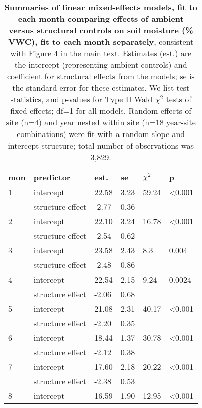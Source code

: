 \documentclass{article}
\begin{document}
\begin{table}[ht]
\centering
\caption{\textbf{Summaries of linear mixed-effects models, fit to each month comparing effects of ambient versus structural controls on soil moisture (\% VWC), fit to each month separately}, consistent with Figure 4 in the main text. Estimates (est.) are the intercept (representing ambient controls) and coefficient for structural effects from the models; se is the standard error for these estimates. We list test statistics, and p-values for Type II Wald $\chi^{2}$ tests of fixed effects; df=1 for all models. Random effects of site (n=4) and year nested within site (n=18 year-site combinations) were fit with a random slope and intercept structure; total number of observations was 3,829.} 
\label{table:shamamb_soilmoism}
\begingroup\footnotesize
\begin{tabular}{|p{}|p{}p{}p{}p{}p{}|}
  \hline
mon & predictor & est. & se & $\chi^2$ & p \\ 
  \hline
  1 & intercept & 22.58 & 3.23 & 59.24 & <0.001 \\ 
   & structure effect & -2.77 & 0.36 &  &  \\ 
   \hline
  2 & intercept & 22.10 & 3.24 & 16.78 & <0.001 \\ 
   & structure effect & -2.54 & 0.62 &  &  \\ 
   \hline
  3 & intercept & 23.58 & 2.43 & 8.3 & 0.004 \\ 
   & structure effect & -2.48 & 0.86 &  &  \\ 
   \hline
  4 & intercept & 22.54 & 2.15 & 9.24 & 0.0024 \\ 
   & structure effect & -2.06 & 0.68 &  &  \\ 
   \hline
  5 & intercept & 21.08 & 2.31 & 40.17 & <0.001 \\ 
   & structure effect & -2.20 & 0.35 &  &  \\ 
   \hline
  6 & intercept & 18.44 & 1.37 & 30.78 & <0.001 \\ 
   & structure effect & -2.12 & 0.38 &  &  \\ 
   \hline
  7 & intercept & 17.60 & 2.18 & 20.22 & <0.001 \\ 
   & structure effect & -2.38 & 0.53 &  &  \\ 
   \hline
  8 & intercept & 16.59 & 1.90 & 12.95 & <0.001 \\ 

\end{tabular}
\end{table}
\end{document}

